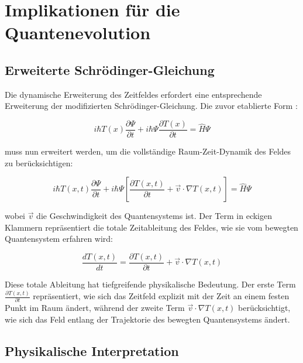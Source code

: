 \documentclass[12pt,a4paper]{article}
\newcommand{\Tfield}{T(x)}
\newcommand{\Tfieldt}{T(x,t)}
\newcommand{\pdTdt}{\frac{\partial\Tfieldt}{\partial t}}
\newcommand{\pdTdx}{\nabla\Tfieldt}
\begin{document}
	\section{Implikationen für die Quantenevolution}
	\label{sec:quantum_evolution}
	
	\subsection{Erweiterte Schrödinger-Gleichung}
	\label{subsec:extended_schrodinger}
	
	Die dynamische Erweiterung des Zeitfeldes erfordert eine entsprechende Erweiterung der modifizierten Schrödinger-Gleichung. Die zuvor etablierte Form \cite{pascher_quantum_2025}:
	
	\begin{equation}
		i\hbar \Tfield \frac{\partial\Psi}{\partial t} + i\hbar \Psi \frac{\partial \Tfield}{\partial t} = \hat{H} \Psi
		\label{eq:original_schrodinger}
	\end{equation}
	
	muss nun erweitert werden, um die vollständige Raum-Zeit-Dynamik des Feldes zu berücksichtigen:
	
	\begin{equation}
		i\hbar \Tfieldt \frac{\partial\Psi}{\partial t} + i\hbar \Psi \left[\frac{\partial \Tfieldt}{\partial t} + \vec{v}\cdot\nabla\Tfieldt\right] = \hat{H} \Psi
		\label{eq:dynamic_schrodinger}
	\end{equation}
	
	wobei $\vec{v}$ die Geschwindigkeit des Quantensystems ist. Der Term in eckigen Klammern repräsentiert die totale Zeitableitung des Feldes, wie sie vom bewegten Quantensystem erfahren wird:
	
	\begin{equation}
		\frac{d\Tfieldt}{dt} = \frac{\partial \Tfieldt}{\partial t} + \vec{v}\cdot\nabla\Tfieldt
		\label{eq:total_derivative}
	\end{equation}
	
	Diese totale Ableitung hat tiefgreifende physikalische Bedeutung. Der erste Term $\pdTdt$ repräsentiert, wie sich das Zeitfeld explizit mit der Zeit an einem festen Punkt im Raum ändert, während der zweite Term $\vec{v}\cdot\pdTdx$ berücksichtigt, wie sich das Feld entlang der Trajektorie des bewegten Quantensystems ändert.
	
	\subsection{Physikalische Interpretation}
	\label{subsec:quantum_interpretation}
	
\end{document}
